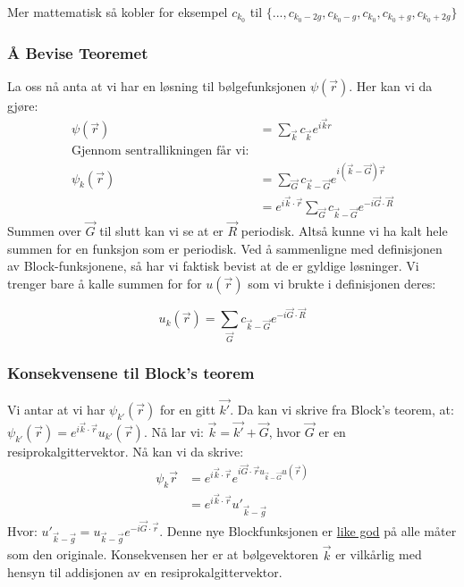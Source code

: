 \documentclass{article}
\begin{document}
Mer mattematisk så kobler for eksempel $c_{k_0}$ til $\{..., c_{k_0 - 2g}, c_{k_0 - g}, c_{k_0}, c_{k_0 + g}, c_{k_0 + 2g}\}$

\subsubsection{Å Bevise Teoremet}
La oss nå anta at vi har en løsning til bølgefunksjonen $\psi(\vec{r})$.
Her kan vi da gjøre:
\begin{align*}
  \psi(\vec{r}) &= \sum_{\vec{k}} c_{\vec{k}} e^{i \vec{k} {r}} \\
  \text{Gjennom sentrallikningen får vi:} \\
   \psi_k(\vec{r})&= \sum_{\vec{G}} c_{\vec{k} - \vec{G}} e^{i(\vec{k} - \vec{G}) 
   \vec{r}} \\
   &= e^{i\vec{k}\cdot\vec{r}} \sum_{\vec{G}}  c_{\vec{k} - \vec{G}}e^{-i \vec{G}\cdot\vec{R}}
\end{align*}
Summen over $\vec{G}$ til slutt kan vi se at er $\vec{R}$ periodisk. Altså kunne vi ha kalt hele summen for en funksjon som er periodisk. Ved å sammenligne med definisjonen av Block-funksjonene, så har vi faktisk bevist at de er gyldige løsninger. Vi trenger bare å kalle summen for for $u(\vec{r})$ som vi brukte i definisjonen deres: 

\begin{equation*}
  u_k(\vec{r}) = \sum_{\vec{G}} c_{\vec{k} - \vec{G}} e^{-i \vec{G} \cdot \vec{R}}
\end{equation*}
\subsubsection{Konsekvensene til Block's teorem}
Vi antar at vi har $\psi_{k'}(\vec{r})$ for en gitt $\vec{k'}$. Da kan vi skrive fra Block's teorem, at: $\psi_{k'}(\vec{r}) = e^{i\vec{k}\cdot\vec{r}} u_{k'}(\vec{r})$. Nå lar vi: $\vec{k} = \vec{k'} + \vec{G}$, hvor $\vec{G}$ er en resiprokalgittervektor. Nå kan vi da skrive:
\begin{align*}
  \psi_k{\vec{r}} &= e^{i \vec{k} \cdot \vec{r}} e^{i \vec{G} \cdot \vec{r} u_{\vec{k} - \vec{G}}u(\vec{r})} \\
  &= e^{i\vec{k}\cdot\vec{r}}{u'}_{\vec{k}-\vec{g}}
\end{align*}
Hvor: ${u'}_{\vec{k}-\vec{g}} = {u}_{\vec{k}-\vec{g}} e^{-i \vec{G}\cdot \vec{r}}$.
Denne nye Blockfunksjonen er \underline{like god} på alle måter som den originale. Konsekvensen her er at bølgevektoren $\vec{k}$ er vilkårlig med hensyn til addisjonen av en resiprokalgittervektor.
\end{document}

